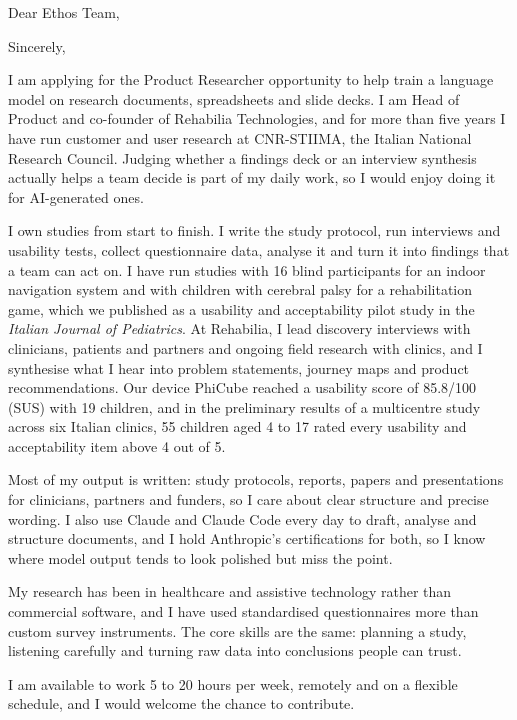 \documentclass[11pt,a4paper,sans]{moderncv}
\begin{document}

\opening{Dear Ethos Team,}
\closing{Sincerely,}
\makelettertitle

I am applying for the Product Researcher opportunity to help train a language model on research documents, spreadsheets and slide decks. I am Head of Product and co-founder of Rehabilia Technologies, and for more than five years I have run customer and user research at CNR-STIIMA, the Italian National Research Council. Judging whether a findings deck or an interview synthesis actually helps a team decide is part of my daily work, so I would enjoy doing it for AI-generated ones.

I own studies from start to finish. I write the study protocol, run interviews and usability tests, collect questionnaire data, analyse it and turn it into findings that a team can act on. I have run studies with 16 blind participants for an indoor navigation system and with children with cerebral palsy for a rehabilitation game, which we published as a usability and acceptability pilot study in the \textit{Italian Journal of Pediatrics}. At Rehabilia, I lead discovery interviews with clinicians, patients and partners and ongoing field research with clinics, and I synthesise what I hear into problem statements, journey maps and product recommendations. Our device PhiCube reached a usability score of 85.8/100 (SUS) with 19 children, and in the preliminary results of a multicentre study across six Italian clinics, 55 children aged 4 to 17 rated every usability and acceptability item above 4 out of 5.

Most of my output is written: study protocols, reports, papers and presentations for clinicians, partners and funders, so I care about clear structure and precise wording. I also use Claude and Claude Code every day to draft, analyse and structure documents, and I hold Anthropic's certifications for both, so I know where model output tends to look polished but miss the point.

My research has been in healthcare and assistive technology rather than commercial software, and I have used standardised questionnaires more than custom survey instruments. The core skills are the same: planning a study, listening carefully and turning raw data into conclusions people can trust.

I am available to work 5 to 20 hours per week, remotely and on a flexible schedule, and I would welcome the chance to contribute.

\makeletterclosing
\end{document}
